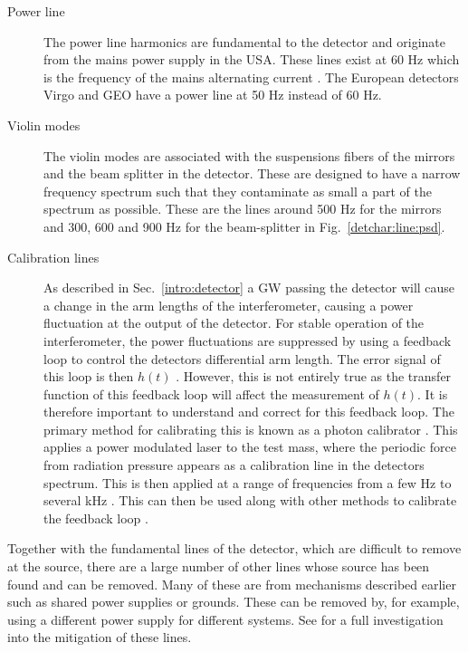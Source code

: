 \begin{description}
	\item[Power line] The power line harmonics are fundamental to the
	detector and originate from the mains power supply in the
	\gls{USA}. These lines exist at 60 Hz which is the frequency of the
	mains alternating current \citep{aasi2015CharacterizationLIGO}. The European
	detectors Virgo and GEO have a power line at 50 Hz instead of 60 Hz.
	
    \item[Violin modes] The violin modes are associated with the
	suspensions fibers of the mirrors and the beam splitter in the detector. These are
	designed to have a narrow frequency spectrum such that they contaminate as
	small a part of the spectrum as possible. These are the lines around 500 Hz for
	the mirrors and 300, 600 and 900 Hz for the beam-splitter \citep{GWOpen} in
	Fig.~\ref{detchar:line:psd}.
	
	\item[Calibration lines] As described in Sec.~\ref{intro:detector} a \gls{GW} passing the detector will cause a change in the arm lengths of the interferometer, causing a power fluctuation at the output of the detector. 
	For stable operation of the interferometer, the power fluctuations are suppressed by using a feedback loop to control the detectors differential arm length. The error signal of this loop is then $h(t)$ \citep{ligoscientificcollaboration2017CalibrationAdvanced}.
	However, this is not entirely true as the transfer function of this feedback loop will affect the measurement of $h(t)$.
	It is therefore important to understand and correct for this feedback loop.
	The primary method for calibrating this is known as a photon calibrator \citep{karki2016AdvancedLIGO}.
	This applies a power modulated laser to the test mass, where the periodic force from radiation pressure appears as a calibration line in the detectors spectrum.
	This is then applied at a range of frequencies from a few Hz to several kHz \citep{karki2016AdvancedLIGO}.
	This can then be used along with other methods to calibrate the feedback loop \citep{ligoscientificcollaboration2017CalibrationAdvanced,coughlin2010NoiseLine,tuyenbayev2016ImprovingLIGO}.
 
\end{description}

Together with the fundamental lines of the detector, which are difficult to remove at the source, there are a large number of other lines whose source has been found and can be removed.  
Many of these are from mechanisms described
earlier such as shared power supplies or grounds. These can be removed by, for
example, using a different power supply for different systems. See
\citep{covas2018IdentificationMitigation} for a full investigation into the
mitigation of these lines.

